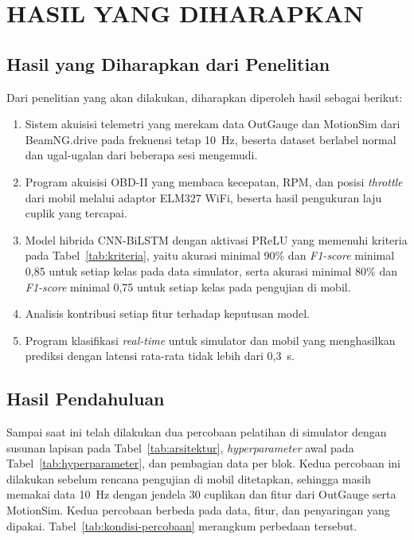 \chapter{HASIL YANG DIHARAPKAN}

\section{Hasil yang Diharapkan dari Penelitian}

Dari penelitian yang akan dilakukan, diharapkan diperoleh hasil sebagai berikut:
\begin{enumerate}
  \item Sistem akuisisi telemetri yang merekam data OutGauge dan MotionSim dari BeamNG.drive pada frekuensi tetap 10~Hz, beserta dataset berlabel normal dan ugal-ugalan dari beberapa sesi mengemudi.
  \item Program akuisisi OBD-II yang membaca kecepatan, RPM, dan posisi \textit{throttle} dari mobil melalui adaptor ELM327 WiFi, beserta hasil pengukuran laju cuplik yang tercapai.
  \item Model hibrida CNN-BiLSTM dengan aktivasi PReLU yang memenuhi kriteria pada Tabel~\ref{tab:kriteria}, yaitu akurasi minimal 90\% dan \textit{F1-score} minimal 0,85 untuk setiap kelas pada data simulator, serta akurasi minimal 80\% dan \textit{F1-score} minimal 0,75 untuk setiap kelas pada pengujian di mobil.
  \item Analisis kontribusi setiap fitur terhadap keputusan model.
  \item Program klasifikasi \textit{real-time} untuk simulator dan mobil yang menghasilkan prediksi dengan latensi rata-rata tidak lebih dari 0,3~s.
\end{enumerate}

\section{Hasil Pendahuluan}

Sampai saat ini telah dilakukan dua percobaan pelatihan di simulator dengan susunan lapisan pada Tabel~\ref{tab:arsitektur}, \textit{hyperparameter} awal pada Tabel~\ref{tab:hyperparameter}, dan pembagian data per blok. Kedua percobaan ini dilakukan sebelum rencana pengujian di mobil ditetapkan, sehingga masih memakai data 10~Hz dengan jendela 30 cuplikan dan fitur dari OutGauge serta MotionSim. Kedua percobaan berbeda pada data, fitur, dan penyaringan yang dipakai. Tabel~\ref{tab:kondisi-percobaan} merangkum perbedaan tersebut.

